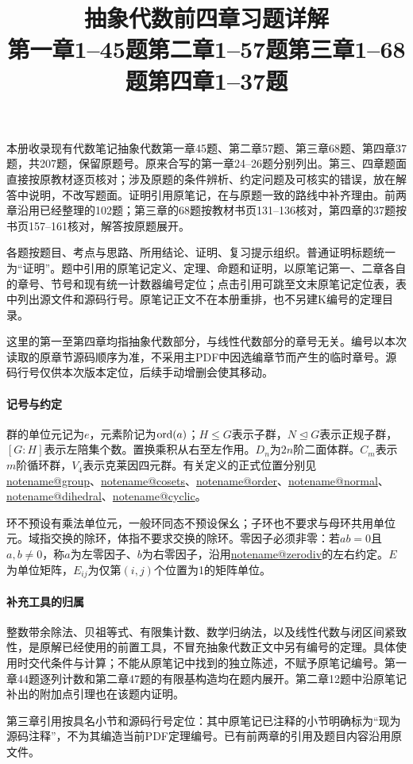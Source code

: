 \documentclass[UTF8,a4paper,11pt,fontset=windows]{ctexart}
\title{抽象代数前四章习题详解\\\large 第一章1--45题\quad 第二章1--57题\quad 第三章1--68题\quad 第四章1--37题}
\author{}\date{}
\makeatletter
\newcommand{\noteref}[1]{\hyperref[note:#1]{\csname notename@#1\endcsname}}
\makeatother
\begin{document}
\maketitle
本册收录现有代数笔记抽象代数第一章45题、第二章57题、第三章68题、第四章37题，共207题，保留原题号。原来合写的第一章24--26题分别列出。第三、四章题面直接按原教材逐页核对；涉及原题的条件辨析、约定问题及可核实的错误，放在解答中说明，不改写题面。证明引用原笔记，在与原题一致的路线中补齐理由。前两章沿用已经整理的102题；第三章的68题按教材书页131--136核对，第四章的37题按书页157--161核对，解答按原题展开。

各题按题目、考点与思路、所用结论、证明、复习提示组织。普通证明标题统一为“证明”。题中引用的原笔记定义、定理、命题和证明，以原笔记第一、二章各自的章号、节号和现有统一计数器编号定位；点击引用可跳至文末原笔记定位表，表中列出源文件和源码行号。原笔记正文不在本册重排，也不另建K编号的定理目录。

这里的第一至第四章均指抽象代数部分，与线性代数部分的章号无关。编号以本次读取的原章节源码顺序为准，不采用主PDF中因选编章节而产生的临时章号。源码行号仅供本次版本定位，后续手动增删会使其移动。

\paragraph{记号与约定}
群的单位元记为$e$，元素阶记为$\operatorname{ord}(a)$；$H\leq G$表示子群，$N\trianglelefteq G$表示正规子群，$[G:H]$表示左陪集个数。置换乘积从右至左作用。$D_n$为$2n$阶二面体群。$C_m$表示$m$阶循环群，$V_4$表示克莱因四元群。有关定义的正式位置分别见\noteref{group}、\noteref{cosets}、\noteref{order}、\noteref{normal}、\noteref{dihedral}、\noteref{cyclic}。

环不预设有乘法单位元，一般环同态不预设保幺；子环也不要求与母环共用单位元。域指交换的除环，体指不要求交换的除环。零因子必须非零：若$ab=0$且$a,b\ne0$，称$a$为左零因子、$b$为右零因子，沿用\noteref{zerodiv}的左右约定。$E$为单位矩阵，$E_{ij}$为仅第$(i,j)$个位置为1的矩阵单位。

\paragraph{补充工具的归属}
整数带余除法、贝祖等式、有限集计数、数学归纳法，以及线性代数与闭区间紧致性，是原解已经使用的前置工具，不冒充抽象代数正文中另有编号的定理。具体使用时交代条件与计算；不能从原笔记中找到的独立陈述，不赋予原笔记编号。第一章44题逐列计数和第二章47题的有限基构造均在题内展开。第二章12题中沿原笔记补出的附加点引理也在该题内证明。

第三章引用按具名小节和源码行号定位：其中原笔记已注释的小节明确标为“现为源码注释”，不为其编造当前PDF定理编号。已有前两章的引用及题目内容沿用原文件。
\end{document}
